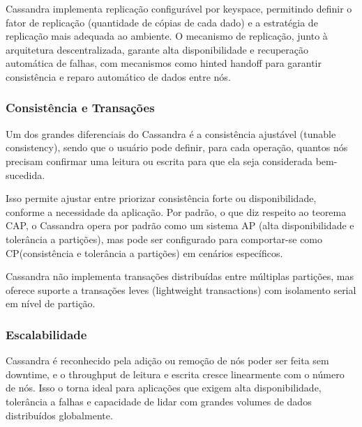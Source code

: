 Cassandra implementa replicação configurável por keyspace, permitindo definir o fator de replicação (quantidade de cópias de cada dado) e a
estratégia de replicação mais adequada ao ambiente. 
O mecanismo de replicação, junto à arquitetura descentralizada, garante alta disponibilidade e recuperação automática de falhas,
com mecanismos como hinted handoff para garantir consistência e reparo automático de dados entre nós.

\subsubsection{Consistência e Transações}

Um dos grandes diferenciais do Cassandra é a consistência ajustável (tunable consistency), sendo que o usuário pode definir,
para cada operação, quantos nós precisam confirmar uma leitura ou escrita para que ela seja considerada bem-sucedida.

Isso permite ajustar entre priorizar consistência forte ou disponibilidade, conforme a necessidade da aplicação.
Por padrão, o que diz respeito ao teorema CAP, o Cassandra opera por padrão como um sistema AP (alta disponibilidade e tolerância a partições), mas pode ser configurado para 
comportar-se como CP(consistência e tolerância a partições) em cenários específicos.

Cassandra não implementa transações distribuídas entre múltiplas partições,
mas oferece suporte a transações leves (lightweight transactions) com isolamento serial em nível de partição.

\subsubsection{Escalabilidade}

Cassandra é reconhecido pela adição ou remoção de nós poder ser feita sem downtime,
e o throughput de leitura e escrita cresce linearmente com o número de nós.
Isso o torna ideal para aplicações que exigem alta disponibilidade, tolerância a falhas e capacidade de lidar com grandes volumes de dados distribuídos globalmente.